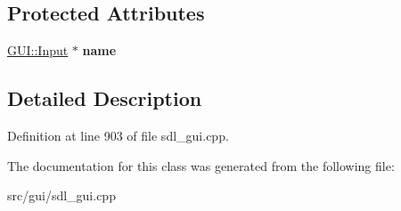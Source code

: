 \subsection*{Protected Attributes}
\begin{DoxyCompactItemize}
\item 
\hypertarget{classSaveDialog_a112cebb10bd8304b2eaf491beded0abb}{\hyperlink{classGUI_1_1Input}{G\-U\-I\-::\-Input} $\ast$ {\bfseries name}}\label{classSaveDialog_a112cebb10bd8304b2eaf491beded0abb}

\end{DoxyCompactItemize}


\subsection{Detailed Description}


Definition at line 903 of file sdl\-\_\-gui.\-cpp.



The documentation for this class was generated from the following file\-:\begin{DoxyCompactItemize}
\item 
src/gui/sdl\-\_\-gui.\-cpp\end{DoxyCompactItemize}
